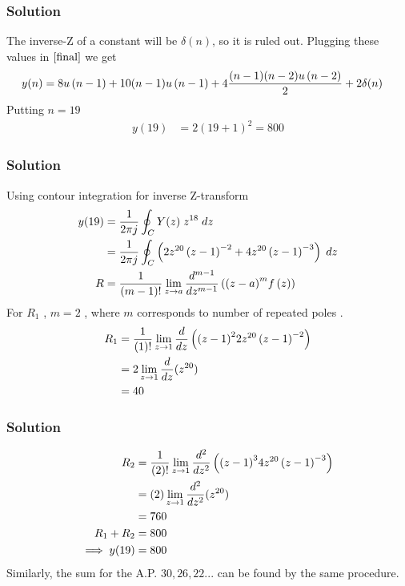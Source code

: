 \documentclass{beamer}
\begin{document}
\begin{frame}
\frametitle{Solution}
The inverse-Z of a constant will be $\delta(n)$, so it is ruled out.
Plugging these values in $\eqref{final}$ we get
\begin{align}
   y(n) &= 8u\left(n-1\right) + 10(n-1)u\left(n-1\right) + 4\frac{(n-1)(n-2)u\left(n-2\right)}{2} +2\delta(n)
\end{align}
Putting $n=19$
\begin{align}
      y(19) &= 2(19+1)^2 = 800
\end{align}
    
\end{frame}







\begin{frame}
\frametitle{Solution}
Using contour integration for inverse Z-transform
\begin{align}
    y(19)&=\frac{1}{2\pi j}\oint_{C}Y(z) \;z^{18} \;dz\\  
 &=\frac{1}{2\pi j}\oint_{C}\left(2z^{20}\left(z-1\right)^{-2}+
       4z^{20}\left(z-1\right)^{-3}\right) \;dz\\
       R&=\frac{1}{\left(m-1\right)!}\lim\limits_{z\to a}\frac{d^{m-1}}{dz^{m-1}}\left({(z-a)}^{m}f\left(z\right)\right)\label{eq:6}  
\end{align}
For $R_1$ , $m=2$ , where $m$ corresponds to number of repeated poles .
\begin{align}
    R_1 &=\frac{1}{\left(1\right)!}\lim\limits_{z\to 1}\frac{d}{dz}\left({(z-1)}^{2}2z^{20}\left(z-1\right)^{-2}\right)   \\
    &=2\lim\limits_{z\to 1}\frac{d}{dz}(z^{20})   \\
    &= 40
    \end{align}
    
\end{frame}





\begin{frame}
\frametitle{Solution}
\begin{align}
    R_2 &=\frac{1}{\left(2\right)!}\lim\limits_{z\to 1}\frac{d^{2}}{dz^{2}}\left({(z-1)}^{3}4z^{20}\left(z-1\right)^{-3}\right)   \\
    &=\left(2\right)\lim\limits_{z\to 1}\frac{d^2}{dz^2}(z^{20})   \\
    &= 760\\
    R_1 + R_2 &= 800\\
    \implies  y{(19)} &= 800
\end{align}
Similarly, the sum for the A.P. $30,26,22...$ can be found by the same procedure.
    
\end{frame}
\end{document}
